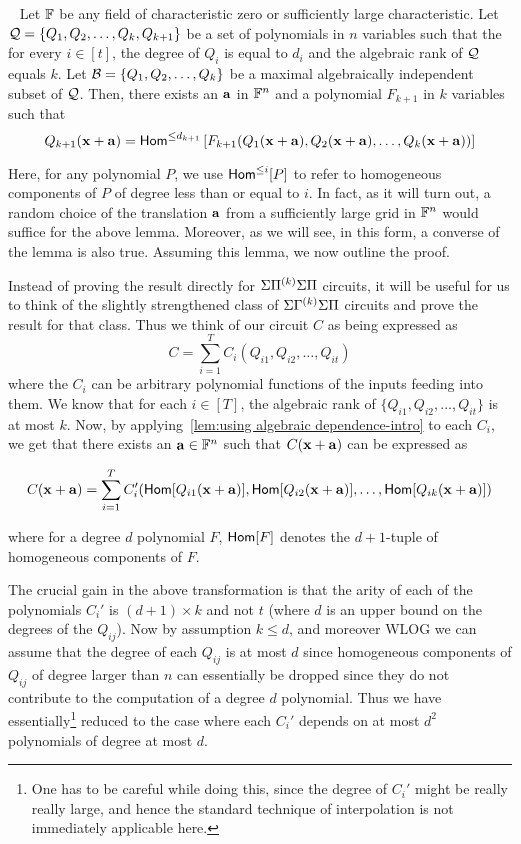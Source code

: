 \begin{lemma}~\label{lem:using algebraic dependence-intro}
Let $\mathbb{F}$ be any  field of characteristic zero or sufficiently large characteristic. Let ${\cal Q} = \{Q_1, Q_2, \ldots, Q_k, Q_{k+1}\}$ be a set of polynomials in $n$ variables such that the for every $i \in [t]$, the degree of  $Q_i$ is equal to $d_i$ and  the algebraic rank of ${\cal Q}$ equals $k$. Let  ${\cal B} = \{Q_1, Q_2, \ldots, Q_k\}$ be a maximal algebraically independent subset of ${\cal Q}$. Then, there exists an $\mathbf{a}$ in $\mathbb{F}^n$ and a polynomial $F_{k+1}$  in $k$ variables such that 
$$Q_{k+1}(\mathbf{x} + \mathbf{a}) = \mathsf{Hom}^{\leq d_{k+1}}\left[F_{k+1}(Q_1(\mathbf{x} + \mathbf{a}), Q_2(\mathbf{x} + \mathbf{a}), \ldots, Q_k(\mathbf{x} + \mathbf{a})) \right] $$
\end{lemma}
Here, for any  polynomial $P$, we use $\mathsf{Hom}^{\leq i}[P]$ to refer to homogeneous components of $P$ of degree less than or equal to $i$. In fact, as it will turn out, a random choice of the translation $\mathbf{a}$ from a sufficiently large grid in $\mathbb{F}^n$ would suffice for the above lemma. 
Moreover, as we will see, in this form, a converse of the lemma is also true. Assuming this lemma, we now outline the proof. 

Instead of proving the result directly for $\Sigma{\Pi^{(k)}}\Sigma\Pi$ circuits, it will be  useful for us to think of  the slightly strengthened class of $\Sigma{\Gamma^{(k)}}\Sigma\Pi$ circuits and prove the result for that class. Thus we think of our circuit $C$ as being expressed as
$$C = \sum_{i = 1}^T  C_{i}(Q_{i1}, Q_{i2}, \ldots, Q_{it})$$  where the $C_i$ can be arbitrary polynomial functions of the inputs feeding into them. We know that for each $i \in [T]$, the algebraic rank of $\{Q_{i1}, Q_{i2}, \ldots, Q_{it}\}$ is at most $k$. Now, by applying~\autoref{lem:using algebraic dependence-intro} to each $C_i$, we get that there exists an $\mathbf{a} \in \mathbb{F}^{n}$ such that $C(\mathbf{x}+\mathbf{a})$ can be expressed as  


\begin{multline}
C(\mathbf{x} + \mathbf{a}) = \sum_{i = 1}^T  C_i'(\mathsf{Hom}[Q_{i1}(\mathbf{x} + \mathbf{a})], \mathsf{Hom}[Q_{i2}(\mathbf{x} + \mathbf{a})], \ldots, \mathsf{Hom}[Q_{ik}(\mathbf{x} + \mathbf{a})])
\end{multline}

where for a degree $d$ polynomial $F$, $\mathsf{Hom}[F]$ denotes the $d+1$-tuple of homogeneous components of $F$. 

The crucial gain in the above transformation is that  the arity of each of the polynomials  $C_i'$ is $(d+1) \times k$ and not $t$ (where $d$ is an upper bound on the degrees of the $Q_{ij}$). Now by assumption $k \leq d$, and moreover WLOG we can assume that the degree of each $Q_{ij}$ is at most $d$ since homogeneous components of $Q_{ij}$ of degree larger than $n$ can essentially be dropped since they do not contribute to the computation of a degree $d$ polynomial. Thus we have essentially\footnote{One has to be careful while doing this, since the degree of $C_i'$ might be really really large, and hence the standard technique of interpolation is not immediately applicable here.} reduced to the case where each $C_i'$ depends on at most $d^2$ polynomials of degree at most $d$.  


